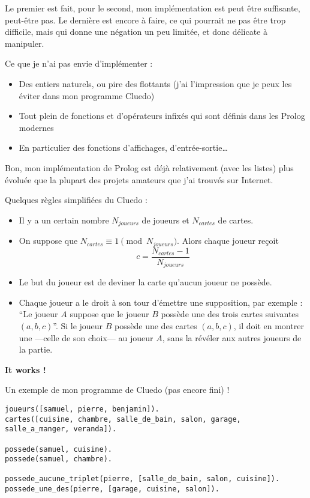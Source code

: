 \documentclass{article}
\begin{document}
Le premier est fait, pour le second, mon implémentation est peut être suffisante, peut-être pas. Le dernière est encore à faire, ce qui pourrait ne pas être trop difficile, mais qui donne une négation un peu limitée, et donc délicate à manipuler.

Ce que je n'ai pas envie d'implémenter :

\begin{itemize}
  \item
    Des entiers naturels, ou pire des flottants (j'ai l'impression que je peux les éviter dans mon programme Cluedo)
  \item
    Tout plein de fonctions et d'opérateurs infixés qui sont définis dans les Prolog modernes
  \item
    En particulier des fonctions d'affichages, d'entrée-sortie\ldots{}
\end{itemize}

Bon, mon implémentation de Prolog est déjà relativement (avec les listes) plus évoluée que la plupart des projets amateurs que j'ai trouvés sur Internet.

Quelques règles simplifiées du Cluedo :

\begin{itemize}
  \item
    Il y a un certain nombre \(N_{joueurs}\) de joueurs et \(N_{cartes}\) de cartes.
  \item
    On suppose que \(N_{cartes} \equiv 1 \pmod {N_{joueurs}}\). Alors chaque joueur reçoit \[c = \frac{N_{cartes}-1}{N_{joueurs}}\]
  \item
    Le but du joueur est de deviner la carte qu'aucun joueur ne possède.
  \item
    Chaque joueur a le droit à son tour d'émettre une supposition, par exemple : ``Le joueur \(A\) suppose que le joueur \(B\) possède une des trois cartes suivantes \((a, b, c)\)''. Si le joueur \(B\) possède une des cartes \((a, b, c)\), il doit en montrer une ---celle de son choix--- au joueur \(A\), sans la révéler aux autres joueurs de la partie.
\end{itemize}

\textbf{It works !}

Un exemple de mon programme de Cluedo (pas encore fini) !

\begin{verbatim}
joueurs([samuel, pierre, benjamin]).
cartes([cuisine, chambre, salle_de_bain, salon, garage, salle_a_manger, veranda]).

possede(samuel, cuisine).
possede(samuel, chambre).

possede_aucune_triplet(pierre, [salle_de_bain, salon, cuisine]).
possede_une_des(pierre, [garage, cuisine, salon]).
\end{verbatim}
\end{document}
